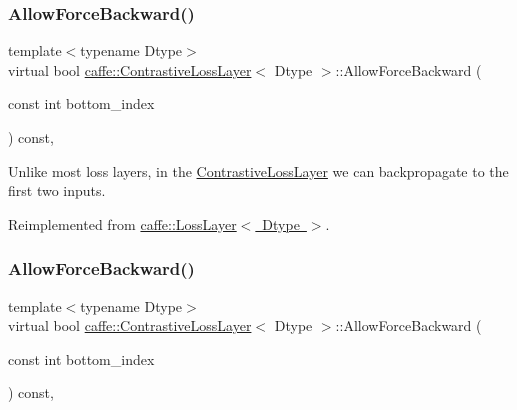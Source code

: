 \subsubsection{\texorpdfstring{Allow\+Force\+Backward()}{AllowForceBackward()}\hspace{0.1cm}{\footnotesize\ttfamily [1/2]}}
{\footnotesize\ttfamily template$<$typename Dtype$>$ \\
virtual bool \mbox{\hyperlink{classcaffe_1_1_contrastive_loss_layer}{caffe\+::\+Contrastive\+Loss\+Layer}}$<$ Dtype $>$\+::Allow\+Force\+Backward (\begin{DoxyParamCaption}\item[{const int}]{bottom\+\_\+index }\end{DoxyParamCaption}) const\hspace{0.3cm}{\ttfamily [inline]}, {\ttfamily [virtual]}}

Unlike most loss layers, in the \mbox{\hyperlink{classcaffe_1_1_contrastive_loss_layer}{Contrastive\+Loss\+Layer}} we can backpropagate to the first two inputs. 

Reimplemented from \mbox{\hyperlink{classcaffe_1_1_loss_layer_a36d35155bfe0de53a79c517f33759612}{caffe\+::\+Loss\+Layer$<$ Dtype $>$}}.

\mbox{\label{classcaffe_1_1_contrastive_loss_layer_af0f16d5119ac6118b670c1966c38fd7d}} 
\subsubsection{\texorpdfstring{Allow\+Force\+Backward()}{AllowForceBackward()}\hspace{0.1cm}{\footnotesize\ttfamily [2/2]}}
{\footnotesize\ttfamily template$<$typename Dtype$>$ \\
virtual bool \mbox{\hyperlink{classcaffe_1_1_contrastive_loss_layer}{caffe\+::\+Contrastive\+Loss\+Layer}}$<$ Dtype $>$\+::Allow\+Force\+Backward (\begin{DoxyParamCaption}\item[{const int}]{bottom\+\_\+index }\end{DoxyParamCaption}) const\hspace{0.3cm}{\ttfamily [inline]}, {\ttfamily [virtual]}}

